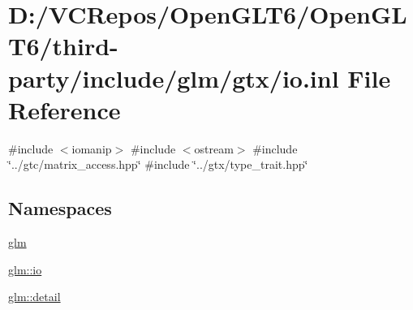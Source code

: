 \hypertarget{io_8inl}{}\section{D\+:/\+V\+C\+Repos/\+Open\+G\+L\+T6/\+Open\+G\+L\+T6/third-\/party/include/glm/gtx/io.inl File Reference}
\label{io_8inl}
{\ttfamily \#include $<$iomanip$>$}\newline
{\ttfamily \#include $<$ostream$>$}\newline
{\ttfamily \#include \char`\"{}../gtc/matrix\+\_\+access.\+hpp\char`\"{}}\newline
{\ttfamily \#include \char`\"{}../gtx/type\+\_\+trait.\+hpp\char`\"{}}\newline
\subsection*{Namespaces}
\begin{DoxyCompactItemize}
\item 
 \mbox{\hyperlink{namespaceglm}{glm}}
\item 
 \mbox{\hyperlink{namespaceglm_1_1io}{glm\+::io}}
\item 
 \mbox{\hyperlink{namespaceglm_1_1detail}{glm\+::detail}}
\end{DoxyCompactItemize}
